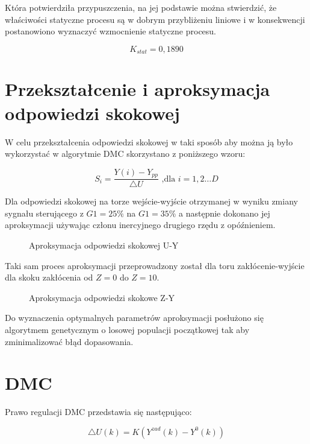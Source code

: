 Która potwierdziła przypuszczenia, na jej podstawie można stwierdzić, że właściwości statyczne procesu są w dobrym przybliżeniu liniowe i w konsekwencji postanowiono wyznaczyć wzmocnienie statyczne procesu.

\begin{equation}
K_{stat} = 0,1890
\end{equation}

\section{Przekształcenie i aproksymacja odpowiedzi skokowej}

W celu przekształcenia odpowiedzi skokowej w taki sposób aby można ją było wykorzystać w algorytmie DMC skorzystano z poniższego wzoru: 

\begin{equation}
S_i=\frac{Y(i)-Y_{pp}}{\triangle U} \textrm{ ,dla } i=1,2 \ldots D
\label{step_norm}
\end{equation}

Dla odpowiedzi skokowej na torze wejście-wyjście otrzymanej w wyniku zmiany sygnału sterującego z $G1 = 25\%$ na $G1 = 35\%$ a następnie dokonano jej aproksymacji używając członu inercyjnego drugiego rzędu z opóźnieniem.

\begin{figure}[H]
\centering

\caption{Aproksymacja odpowiedzi skokowej U-Y}
\end{figure}

Taki sam proces aproksymacji przeprowadzony został dla toru zakłócenie-wyjście dla skoku zakłócenia od $Z = 0$ do $Z = 10$.

\begin{figure}[H]
\centering

\caption{Aproksymacja odpowiedzi skokowe Z-Y}
\end{figure}

Do wyznaczenia optymalnych parametrów aproksymacji posłużono się algorytmem genetycznym o losowej populacji początkowej tak aby zminimalizować błąd dopasowania.

\section{DMC}

Prawo regulacji DMC przedstawia się następująco:

\begin{equation}
\triangle U(k)=K(Y^{zad}(k)-Y^0(k))
\end{equation}

